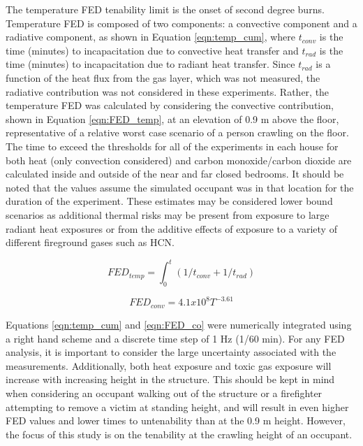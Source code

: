 \documentclass[12pt,oneside]{article}
\begin{document}
The temperature FED tenability limit is the onset of second degree burns. Temperature FED is composed of two components: a convective component and a radiative component, as shown in Equation \ref{eqn:temp_cum}, where $t_{conv}$ is the time (minutes) to incapacitation due to convective heat transfer and $t_{rad}$ is the time (minutes) to incapacitation due to radiant heat transfer. Since $t_{rad}$ is a function of the heat flux from the gas layer, which was not measured, the radiative contribution was not considered in these experiments. Rather, the temperature FED was calculated by considering the convective contribution, shown in Equation \ref{eqn:FED_temp}, at an elevation of 0.9 m above the floor, representative of a relative worst case scenario of a person crawling on the floor. The time to exceed the thresholds for all of the experiments in each house for both heat (only convection considered) and carbon monoxide/carbon dioxide are calculated inside and outside of the near and far closed bedrooms.   It should be noted that the values assume the simulated occupant was in that location for the duration of the experiment. These estimates may be considered lower bound scenarios as additional thermal risks may be present from exposure to large radiant heat exposures or from the additive effects of exposure to a variety of different fireground gases such as HCN.  


\begin{equation}\label{eqn:temp_cum}FED_{temp}=\int_{0}^{t}(1/t_{conv}+1/t_{rad})\end{equation}

\begin{equation}\label{eqn:FED_temp}FED_{conv}=4.1x10^8{T^{-3.61}}\end{equation}



Equations \ref{eqn:temp_cum} and \ref{eqn:FED_co} were numerically integrated using a right hand scheme and a discrete time step of 1 Hz (1/60 min). For any FED analysis, it is important to consider the large uncertainty associated with the measurements. Additionally, both heat exposure and toxic gas exposure will increase with increasing height in the structure. This should be kept in mind when considering an occupant walking out of the structure or a firefighter attempting to remove a victim at standing height,  and will result in even higher FED values and lower times to untenability than at the 0.9 m height. However, the focus of this study is on the tenability at the crawling height of an occupant.
\end{document}
